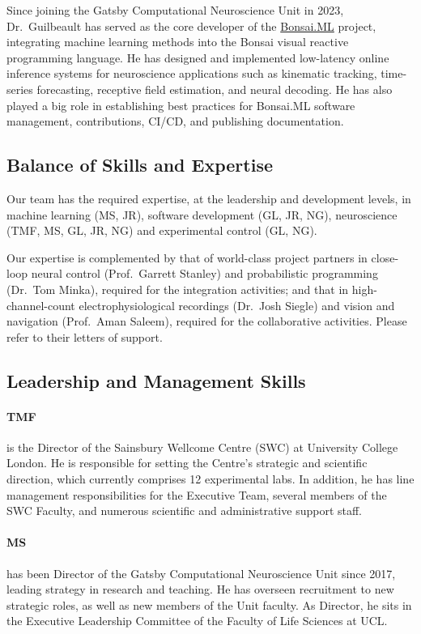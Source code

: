 Since joining the Gatsby Computational Neuroscience Unit in 2023, Dr.~Guilbeault has served as the core developer of the \href{https://bonsai-rx.org/machinelearning}{Bonsai.ML}
project, integrating machine learning methods into the Bonsai visual reactive programming language. He has designed and implemented low-latency online inference systems for neuroscience applications such as kinematic tracking, time-series forecasting, receptive field estimation, and neural decoding. He has also played a big role in establishing best practices for Bonsai.ML software management, contributions, CI/CD, and publishing documentation.

\subsection{Balance of Skills and Expertise}

Our team has the required expertise, at the leadership and development levels,
in machine learning (MS, JR), software development (GL, JR, NG), neuroscience
(TMF, MS, GL, JR, NG) and experimental control (GL, NG).

Our expertise is complemented by that of world-class project partners in
close-loop neural control (Prof.~Garrett Stanley) and probabilistic programming
(Dr.~Tom Minka), required for the integration activities; and that in
high-channel-count electrophysiological recordings (Dr.~Josh Siegle) and vision
and navigation (Prof.~Aman Saleem), required for the collaborative activities.
Please refer to their letters of support.

\subsection{Leadership and Management Skills}

\paragraph{TMF} is the Director of the Sainsbury Wellcome Centre (SWC) at
University College London. He is responsible for setting the Centre’s strategic
and scientific direction, which currently comprises 12 experimental labs. In
addition, he has line management responsibilities for the Executive Team,
several members of the SWC Faculty, and numerous scientific and administrative
support staff.

\paragraph{MS} has been Director of the Gatsby Computational
Neuroscience Unit since 2017, leading strategy in research and teaching. He has overseen
recruitment to new strategic roles, as well as new members of the Unit faculty.
As Director, he sits in the Executive
Leadership Committee of the Faculty of Life Sciences at UCL.

